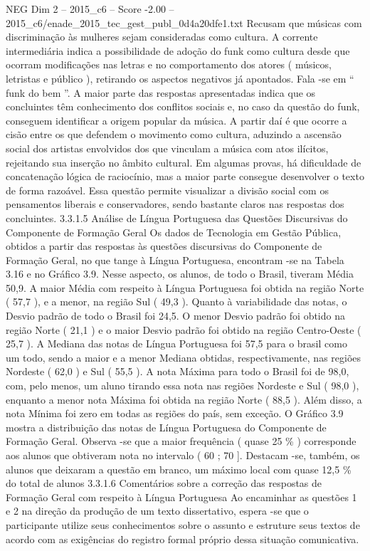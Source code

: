 \begin{textsample}{NEG Dim 2 – 2015\_c6 – Score -2.00 – 2015\_c6/enade\_2015\_tec\_gest\_publ\_0d4a20dfe1.txt}
Recusam que músicas com discriminação às mulheres sejam consideradas como cultura.
A corrente intermediária indica a possibilidade de adoção do funk como cultura desde que ocorram modificações nas letras e no comportamento dos atores ( músicos, letristas e público ), retirando os aspectos negativos já apontados.
Fala -se em “ funk do bem ”.
A maior parte das respostas apresentadas indica que os concluintes têm conhecimento dos conflitos sociais e, no caso da questão do funk, conseguem identificar a origem popular da música.
A partir daí é que ocorre a cisão entre os que defendem o movimento como cultura, aduzindo a ascensão social dos artistas envolvidos dos que vinculam a música com atos ilícitos, rejeitando sua inserção no âmbito cultural.
Em algumas provas, há dificuldade de concatenação lógica de raciocínio, mas a maior parte consegue desenvolver o texto de forma razoável.
Essa questão permite visualizar a divisão social com os pensamentos liberais e conservadores, sendo bastante claros nas respostas dos concluintes. 3.3.1.5 Análise de Língua Portuguesa das Questões Discursivas do Componente de Formação Geral Os dados de Tecnologia em Gestão Pública, obtidos a partir das respostas às questões discursivas do Componente de Formação Geral, no que tange à Língua Portuguesa, encontram -se na Tabela 3.16 e no Gráfico 3.9.
Nesse aspecto, os alunos, de todo o Brasil, tiveram Média 50,9.
A maior Média com respeito à Língua Portuguesa foi obtida na região Norte ( 57,7 ), e a menor, na região Sul ( 49,3 ).
Quanto à variabilidade das notas, o Desvio padrão de todo o Brasil foi 24,5.
O menor Desvio padrão foi obtido na região Norte ( 21,1 ) e o maior Desvio padrão foi obtido na região Centro-Oeste ( 25,7 ).
A Mediana das notas de Língua Portuguesa foi 57,5 para o brasil como um todo, sendo a maior e a menor Mediana obtidas, respectivamente, nas regiões Nordeste ( 62,0 ) e Sul ( 55,5 ).
A nota Máxima para todo o Brasil foi de 98,0, com, pelo menos, um aluno tirando essa nota nas regiões Nordeste e Sul ( 98,0 ), enquanto a menor nota Máxima foi obtida na região Norte ( 88,5 ).
Além disso, a nota Mínima foi zero em todas as regiões do país, sem exceção.
O Gráfico 3.9 mostra a distribuição das notas de Língua Portuguesa do Componente de Formação Geral.
Observa -se que a maior frequência ( quase 25 \% ) corresponde aos alunos que obtiveram nota no intervalo ( 60 ; 70 ].
Destacam -se, também, os alunos que deixaram a questão em branco, um máximo local com quase 12,5 \% do total de alunos 3.3.1.6 Comentários sobre a correção das respostas de Formação Geral com respeito à Língua Portuguesa Ao encaminhar as questões 1 e 2 na direção da produção de um texto dissertativo, espera -se que o participante utilize seus conhecimentos sobre o assunto e estruture seus textos de acordo com as exigências do registro formal próprio dessa situação comunicativa.

\end{textsample}
